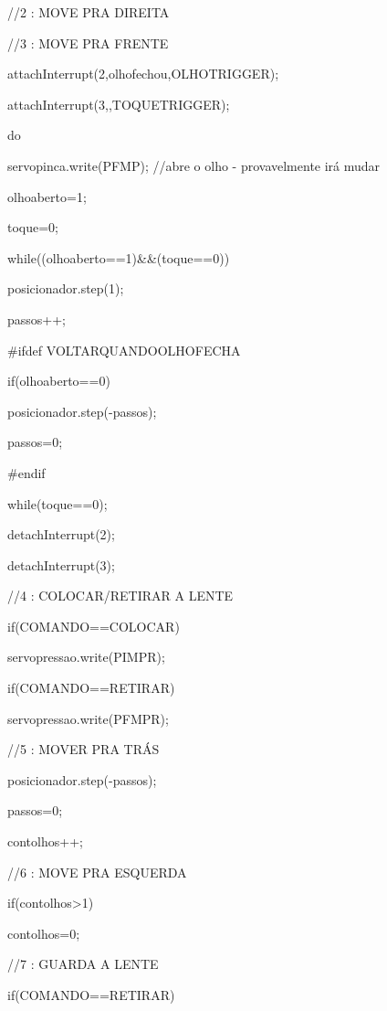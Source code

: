 \begin{apendicesenv}
{{   
   }
  
   //2 : MOVE PRA DIREITA
   
   //3 : MOVE PRA FRENTE

    attachInterrupt(2,olhofechou,OLHOTRIGGER);

    attachInterrupt(3,,TOQUETRIGGER);
    
    do{

    servopinca.write(PFMP); //abre o olho - provavelmente irá mudar

    olhoaberto=1;

    toque=0;

    while((olhoaberto==1)\&\&(toque==0)){

       posicionador.step(1);

       passos++; 
    }
  

    \#ifdef VOLTARQUANDOOLHOFECHA  

      if(olhoaberto==0){

        posicionador.step(-passos);

        passos=0;

      }

    \#endif  
    

    }while(toque==0);

    detachInterrupt(2);

    detachInterrupt(3);

    
    //4 : COLOCAR/RETIRAR A LENTE

      if(COMANDO==COLOCAR){

        servopressao.write(PIMPR);

      }

      if(COMANDO==RETIRAR){

        servopressao.write(PFMPR);

      }
    

    //5 : MOVER PRA TRÁS

      posicionador.step(-passos);

      passos=0;

      contolhos++;
    

    //6 : MOVE PRA ESQUERDA

      if(contolhos>1){

        contolhos=0;
      }
   

    //7 : GUARDA A LENTE

      if(COMANDO==RETIRAR){

      }   
  
}



\end{apendicesenv}
